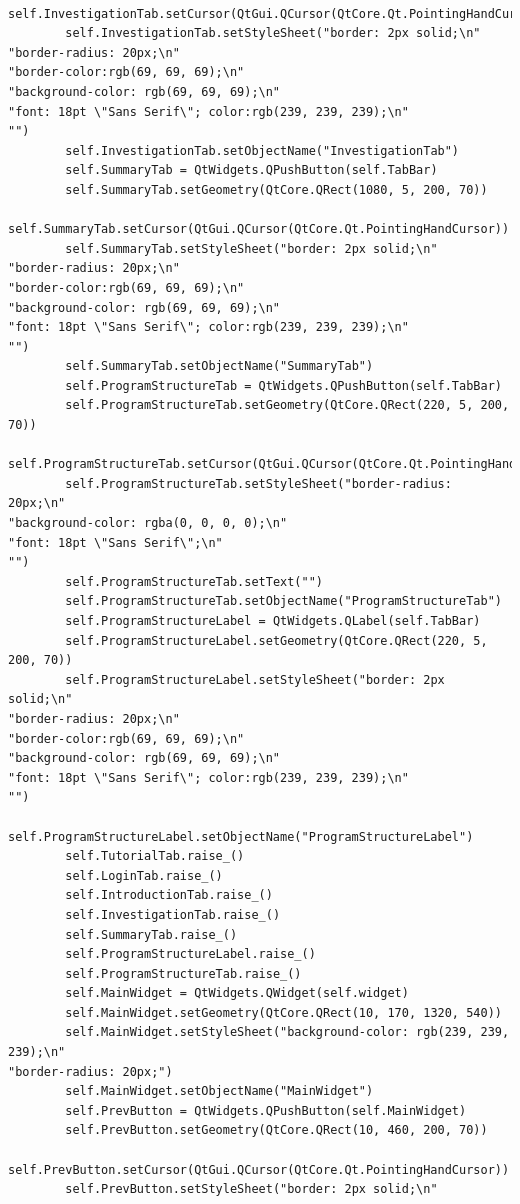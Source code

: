 \documentclass{article}
\begin{document}
\begin{lstlisting}
        self.InvestigationTab.setCursor(QtGui.QCursor(QtCore.Qt.PointingHandCursor))
        self.InvestigationTab.setStyleSheet("border: 2px solid;\n"
"border-radius: 20px;\n"
"border-color:rgb(69, 69, 69);\n"
"background-color: rgb(69, 69, 69);\n"
"font: 18pt \"Sans Serif\"; color:rgb(239, 239, 239);\n"
"")
        self.InvestigationTab.setObjectName("InvestigationTab")
        self.SummaryTab = QtWidgets.QPushButton(self.TabBar)
        self.SummaryTab.setGeometry(QtCore.QRect(1080, 5, 200, 70))
        self.SummaryTab.setCursor(QtGui.QCursor(QtCore.Qt.PointingHandCursor))
        self.SummaryTab.setStyleSheet("border: 2px solid;\n"
"border-radius: 20px;\n"
"border-color:rgb(69, 69, 69);\n"
"background-color: rgb(69, 69, 69);\n"
"font: 18pt \"Sans Serif\"; color:rgb(239, 239, 239);\n"
"")
        self.SummaryTab.setObjectName("SummaryTab")
        self.ProgramStructureTab = QtWidgets.QPushButton(self.TabBar)
        self.ProgramStructureTab.setGeometry(QtCore.QRect(220, 5, 200, 70))
        self.ProgramStructureTab.setCursor(QtGui.QCursor(QtCore.Qt.PointingHandCursor))
        self.ProgramStructureTab.setStyleSheet("border-radius: 20px;\n"
"background-color: rgba(0, 0, 0, 0);\n"
"font: 18pt \"Sans Serif\";\n"
"")
        self.ProgramStructureTab.setText("")
        self.ProgramStructureTab.setObjectName("ProgramStructureTab")
        self.ProgramStructureLabel = QtWidgets.QLabel(self.TabBar)
        self.ProgramStructureLabel.setGeometry(QtCore.QRect(220, 5, 200, 70))
        self.ProgramStructureLabel.setStyleSheet("border: 2px solid;\n"
"border-radius: 20px;\n"
"border-color:rgb(69, 69, 69);\n"
"background-color: rgb(69, 69, 69);\n"
"font: 18pt \"Sans Serif\"; color:rgb(239, 239, 239);\n"
"")
        self.ProgramStructureLabel.setObjectName("ProgramStructureLabel")
        self.TutorialTab.raise_()
        self.LoginTab.raise_()
        self.IntroductionTab.raise_()
        self.InvestigationTab.raise_()
        self.SummaryTab.raise_()
        self.ProgramStructureLabel.raise_()
        self.ProgramStructureTab.raise_()
        self.MainWidget = QtWidgets.QWidget(self.widget)
        self.MainWidget.setGeometry(QtCore.QRect(10, 170, 1320, 540))
        self.MainWidget.setStyleSheet("background-color: rgb(239, 239, 239);\n"
"border-radius: 20px;")
        self.MainWidget.setObjectName("MainWidget")
        self.PrevButton = QtWidgets.QPushButton(self.MainWidget)
        self.PrevButton.setGeometry(QtCore.QRect(10, 460, 200, 70))
        self.PrevButton.setCursor(QtGui.QCursor(QtCore.Qt.PointingHandCursor))
        self.PrevButton.setStyleSheet("border: 2px solid;\n"

\end{lstlisting}
\end{document}
